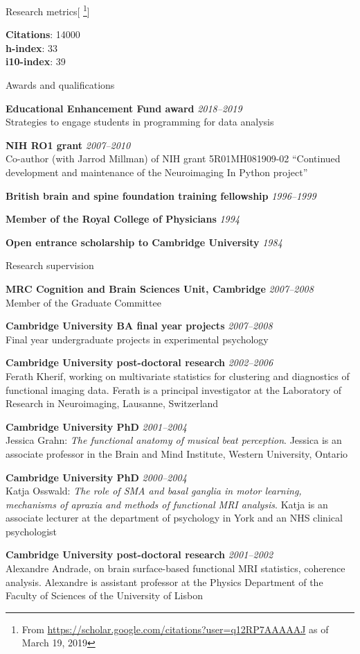 \documentclass{cv}
\newcommand{\PlaceDateNote}[3]{{\bf #1} \hfill {\em #2} \\#3}
\newcommand{\CBU}{MRC Cognition and Brain Sciences Unit, Cambridge}
\begin{document}
\begin{cvSection}{Research metrics}[
    \footnote{ From
    \url{https://scholar.google.com/citations?user=q12RP7AAAAAJ} as of March
    19, 2019}]

{\bf Citations}: 14000 \\
{\bf h-index}: 33 \\
{\bf i10-index}: 39

\end{cvSection}

\begin{cvSection}{Awards and qualifications}

\PlaceDateNote{Educational Enhancement Fund award}{2018--2019}
{Strategies to engage students in programming for data analysis
}

\PlaceDateNote{NIH RO1 grant}{2007--2010}
{Co-author (with Jarrod Millman) of NIH grant 5R01MH081909-02 ``Continued
development and maintenance of the Neuroimaging In Python project''}

{\bf British brain and spine foundation training fellowship} \hfill {\em
1996--1999}

{\bf Member of the Royal College of Physicians} \hfill {\em 1994}

{\bf Open entrance scholarship to Cambridge University} \hfill {\em 1984}

\end{cvSection}

\begin{cvSection}{Research supervision}

\PlaceDateNote{\CBU}{2007--2008}
{Member of the Graduate Committee}

\PlaceDateNote{Cambridge University BA final year projects}{2007--2008}
{Final year undergraduate projects in experimental psychology}

\PlaceDateNote{Cambridge University post-doctoral research}{2002--2006}
{Ferath Kherif, working on multivariate statistics for clustering and
diagnostics of functional imaging data. Ferath is a principal investigator at
the Laboratory of Research in Neuroimaging, Lausanne, Switzerland}

\PlaceDateNote{Cambridge University PhD}{2001--2004}
{Jessica Grahn: {\em The functional anatomy of musical beat perception}.
Jessica is an associate professor in the Brain and Mind Institute, Western
University, Ontario}

\PlaceDateNote{Cambridge University PhD}{2000--2004}
{Katja Osswald: {\em The role of SMA and basal ganglia in motor learning,
mechanisms of apraxia and methods of functional MRI analysis}. Katja is an
associate lecturer at the department of psychology in York and an NHS clinical
psychologist}

\PlaceDateNote{Cambridge University post-doctoral research}{2001--2002}
{Alexandre Andrade, on brain surface-based functional MRI statistics, coherence
analysis.  Alexandre is assistant professor at the Physics Department of the
Faculty of Sciences of the University of Lisbon}

\end{cvSection}
\end{document}

